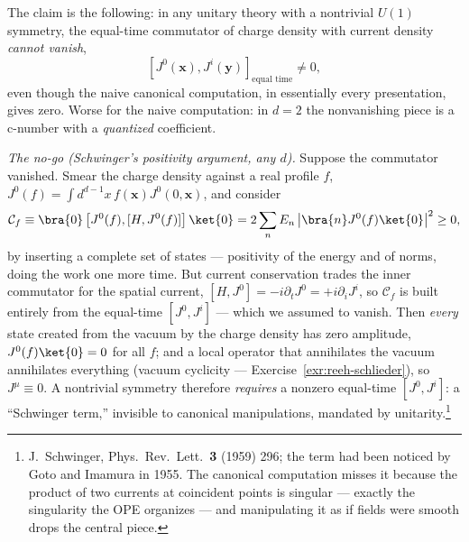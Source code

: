 \begin{eexample}
\label{ex:schwinger-term}
The claim is the following: in any unitary theory with a nontrivial
$U(1)$ symmetry, the equal-time commutator of charge density with current
density \emph{cannot vanish},
\begin{equation}
\left[ J^0(\mathbf{x}), J^i(\mathbf{y})\right]_{\text{equal time}} \ne 0,
\end{equation}
even though the naive canonical computation, in essentially every
presentation, gives zero. Worse for the naive computation: in $d = 2$ the
nonvanishing piece is a c-number with a \emph{quantized} coefficient.

\emph{The no-go (Schwinger's positivity argument, any $d$).} Suppose the
commutator vanished. Smear the charge density against a real profile $f$,
$J^0(f) = \int d^{d-1}x\, f(\mathbf{x}) J^0(0,\mathbf{x})$, and consider
\begin{equation}
\mathcal{C}_f \equiv
\bra{0}\left[ J^0(f), [ H, J^0(f)]\right]\ket{0}
= 2\sum_n E_n \left|\bra{n} J^0(f)\ket{0}\right|^2 \ge 0,
\label{eq:schwinger-positivity}
\end{equation}
by inserting a complete set of states --- positivity of the energy and of
norms, doing the work one more time. But current conservation trades the
inner commutator for the spatial current, $[H, J^0] = -i\partial_t J^0 =
+i\partial_i J^i$, so $\mathcal{C}_f$ is built entirely from the equal-time
$[J^0, J^i]$ --- which we assumed to vanish. Then \emph{every} state created
from the vacuum by the charge density has zero amplitude, $J^0(f)\ket{0} = 0$
for all $f$; and a local operator that annihilates the vacuum annihilates
everything (vacuum cyclicity --- Exercise~\ref{exr:reeh-schlieder}), so
$J^\mu \equiv 0$. A nontrivial symmetry therefore \emph{requires} a nonzero
equal-time $[J^0, J^i]$: a ``Schwinger term,'' invisible to canonical
manipulations, mandated by unitarity.\footnote{J.~Schwinger, Phys.\ Rev.\
Lett.\ \textbf{3} (1959) 296; the term had been noticed by Goto and Imamura
in 1955. The canonical computation misses it because the product of two
currents at coincident points is singular --- exactly the singularity the
OPE organizes --- and manipulating it as if fields were smooth drops the
central piece.}


\end{eexample}
